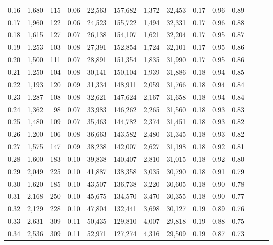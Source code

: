 \begin{tabular}{rrrrrrrrrrrrrr}
0.16 &  1,680 &  115 &  0.06 &   22,563 &  157,682 &   1,372 &  32,453 &  0.17 &  0.96 &      0.89 \\
0.17 &  1,960 &  122 &  0.06 &   24,523 &  155,722 &   1,494 &  32,331 &  0.17 &  0.96 &      0.88 \\
0.18 &  1,615 &  127 &  0.07 &   26,138 &  154,107 &   1,621 &  32,204 &  0.17 &  0.95 &      0.87 \\
0.19 &  1,253 &  103 &  0.08 &   27,391 &  152,854 &   1,724 &  32,101 &  0.17 &  0.95 &      0.86 \\
0.20 &  1,500 &  111 &  0.07 &   28,891 &  151,354 &   1,835 &  31,990 &  0.17 &  0.95 &      0.86 \\
0.21 &  1,250 &  104 &  0.08 &   30,141 &  150,104 &   1,939 &  31,886 &  0.18 &  0.94 &      0.85 \\
0.22 &  1,193 &  120 &  0.09 &   31,334 &  148,911 &   2,059 &  31,766 &  0.18 &  0.94 &      0.84 \\
0.23 &  1,287 &  108 &  0.08 &   32,621 &  147,624 &   2,167 &  31,658 &  0.18 &  0.94 &      0.84 \\
0.24 &  1,362 &   98 &  0.07 &   33,983 &  146,262 &   2,265 &  31,560 &  0.18 &  0.93 &      0.83 \\
0.25 &  1,480 &  109 &  0.07 &   35,463 &  144,782 &   2,374 &  31,451 &  0.18 &  0.93 &      0.82 \\
0.26 &  1,200 &  106 &  0.08 &   36,663 &  143,582 &   2,480 &  31,345 &  0.18 &  0.93 &      0.82 \\
0.27 &  1,575 &  147 &  0.09 &   38,238 &  142,007 &   2,627 &  31,198 &  0.18 &  0.92 &      0.81 \\
0.28 &  1,600 &  183 &  0.10 &   39,838 &  140,407 &   2,810 &  31,015 &  0.18 &  0.92 &      0.80 \\
0.29 &  2,049 &  225 &  0.10 &   41,887 &  138,358 &   3,035 &  30,790 &  0.18 &  0.91 &      0.79 \\
0.30 &  1,620 &  185 &  0.10 &   43,507 &  136,738 &   3,220 &  30,605 &  0.18 &  0.90 &      0.78 \\
0.31 &  2,168 &  250 &  0.10 &   45,675 &  134,570 &   3,470 &  30,355 &  0.18 &  0.90 &      0.77 \\
0.32 &  2,129 &  228 &  0.10 &   47,804 &  132,441 &   3,698 &  30,127 &  0.19 &  0.89 &      0.76 \\
0.33 &  2,631 &  309 &  0.11 &   50,435 &  129,810 &   4,007 &  29,818 &  0.19 &  0.88 &      0.75 \\
0.34 &  2,536 &  309 &  0.11 &   52,971 &  127,274 &   4,316 &  29,509 &  0.19 &  0.87 &      0.73 \\

\end{tabular}
